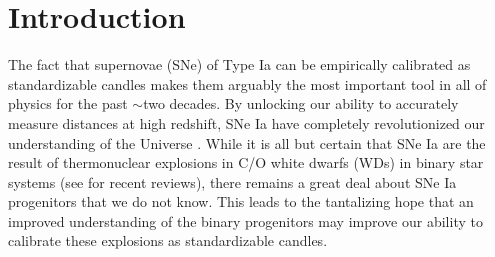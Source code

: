 \documentclass[twocolumn]{./aastex63}
\begin{document}


\section{Introduction}

The fact that supernovae (SNe) of Type Ia can be empirically calibrated as
standardizable candles makes them arguably the most important tool in all of
physics for the past $\sim$two decades. By unlocking our ability to accurately
measure distances at high redshift, SNe Ia have completely revolutionized our
understanding of the Universe \citep{Riess98,Perlmutter99}. While it is all but
certain that SNe Ia are the result of thermonuclear explosions in C/O white
dwarfs (WDs) in binary star systems (see \citealt{Maoz14,Livio18} for recent
reviews), there remains a great deal about SNe Ia progenitors that we do not
know. This leads to the tantalizing hope that an improved understanding of the
binary progenitors may improve our ability to calibrate these explosions as
standardizable candles.
\end{document}
